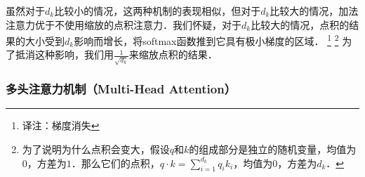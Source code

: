 虽然对于$d_k$比较小的情况，这两种机制的表现相似，但对于$d_k$比较大的情况，加法注意力优于不使用缩放的点积注意力\citep{DBLP:journals/corr/BritzGLL17}．我们怀疑，对于$d_k$比较大的情况，点积的结果的大小受到$d_k$影响而增长，将softmax函数推到它具有极小梯度的区域．
\footnote{译注：梯度消失}
\footnote{为了说明为什么点积会变大，假设$q$和$k$的组成部分是独立的随机变量，均值为$0$，方差为$1$．那么它们的点积，$q \cdot k = \sum_{i=1}^{d_k} q_ik_i$，均值为$0$，方差为$d_k$．}
为了抵消这种影响，我们用$\frac{1}{\sqrt{d_k}}$来缩放点积的结果．



\subsubsection{多头注意力机制（Multi-Head Attention）} \label{sec:multihead}


